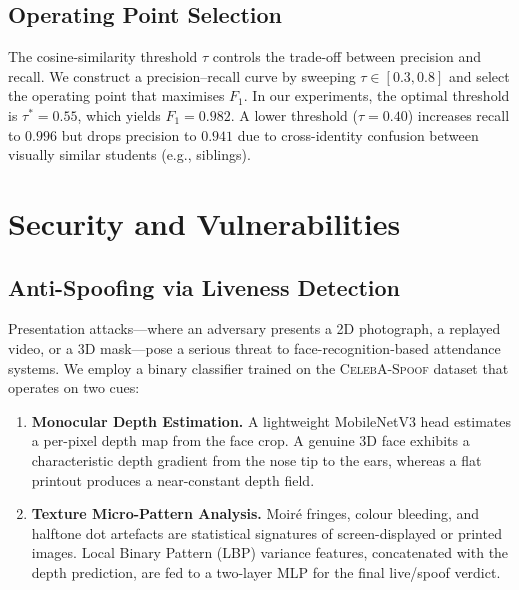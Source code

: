 \documentclass[conference, 10pt]{IEEEtran}
\begin{document}
\subsection{Operating Point Selection}

The cosine-similarity threshold $\tau$ controls the trade-off between precision and recall.
We construct a precision--recall curve by sweeping $\tau \in [0.3, 0.8]$ and select the
operating point that maximises $F_1$.  In our experiments, the optimal threshold is
$\tau^* = 0.55$, which yields $F_1 = 0.982$.  A lower threshold ($\tau = 0.40$) increases
recall to $0.996$ but drops precision to $0.941$ due to cross-identity confusion between
visually similar students (e.g., siblings).


\section{Security and Vulnerabilities}
\label{sec:security}

\subsection{Anti-Spoofing via Liveness Detection}

Presentation attacks---where an adversary presents a 2D photograph, a replayed video, or a 3D
mask---pose a serious threat to face-recognition-based attendance systems.  We employ a binary
classifier trained on the \textsc{CelebA-Spoof} dataset that operates on two cues:

\begin{enumerate}
    \item \textbf{Monocular Depth Estimation.}  A lightweight MobileNetV3 head estimates a
          per-pixel depth map from the face crop.  A genuine 3D face exhibits a characteristic
          depth gradient from the nose tip to the ears, whereas a flat printout produces a
          near-constant depth field.
    \item \textbf{Texture Micro-Pattern Analysis.}  Moiré fringes, colour bleeding, and
          halftone dot artefacts are statistical signatures of screen-displayed or printed
          images.  Local Binary Pattern (LBP) variance features, concatenated with the depth
          prediction, are fed to a two-layer MLP for the final live/spoof verdict.
\end{enumerate}
\end{document}
